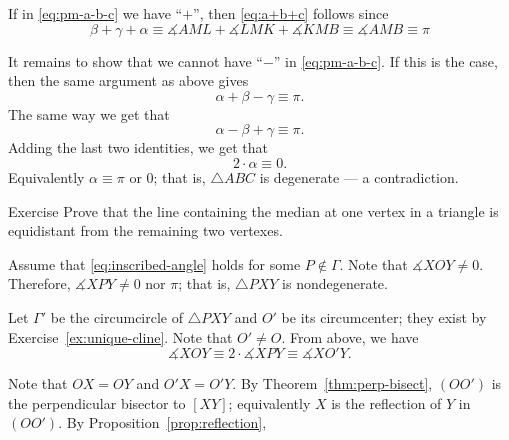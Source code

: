If in \ref{eq:pm-a-b-c} we have ``$+$'', then \ref{eq:a+b+c} follows since
$$\beta+\gamma+\alpha
\equiv
\measuredangle A M L + \measuredangle L M K + \measuredangle K M B
\equiv
\measuredangle A M B 
\equiv
\pi
$$

It remains to show that we cannot have ``$-$'' in \ref{eq:pm-a-b-c}.
If this is the case, then the same argument as above gives
$$\alpha+\beta-\gamma\equiv\pi.$$
The same way we get that
$$\alpha-\beta+\gamma\equiv\pi.$$
Adding the last two identities, we get that
$$2\cdot\alpha\equiv0.$$
Equivalently 
$\alpha\equiv\pi$ or $0$;
that is, $\triangle A B C$ is degenerate --- a contradiction.
\qeds
















\begin{thm}{Exercise}\label{ex:median-equidistant}
Prove that the line containing the median at one vertex in a triangle is equidistant from the remaining two vertexes. 
\end{thm}















Assume that \ref{eq:inscribed-angle} holds for some $P\notin \Gamma$.
Note that $\measuredangle X O Y\ne 0$. 
Therefore, $\measuredangle X P Y\ne 0$ nor $\pi$;
that is, $\triangle PXY$ is nondegenerate.

Let $\Gamma'$ be the circumcircle of $\triangle PXY$
and $O'$ be its circumcenter;
they exist by Exercise~\ref{ex:unique-cline}.
Note that $O'\ne O$.
From above, we have 
$$\measuredangle X O Y\equiv 2\cdot\measuredangle X P Y\equiv \measuredangle X O' Y.$$


Note that $OX=OY$ and $O'X=O'Y$.
By Theorem~\ref{thm:perp-bisect},
$(OO')$ is the perpendicular bisector to $[XY]$;
equivalently $X$ is the reflection of $Y$ in $(OO')$.
By Proposition~\ref{prop:reflection},

